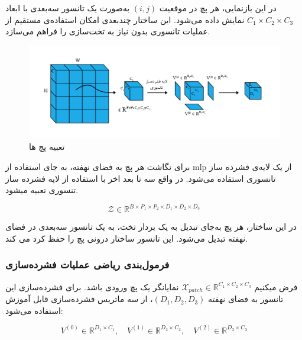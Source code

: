 در این بازنمایی، هر پچ در موقعیت $(i,j)$ به‌صورت یک تانسور سه‌بعدی با ابعاد $C_1 \times C_2 \times C_3$ نمایش داده می‌شود. این ساختار چندبعدی امکان استفاده‌ی مستقیم از عملیات تانسوری بدون نیاز به تخت‌سازی را فراهم می‌سازد.







\begin{figure}[h]
	\centering
	\begin{minipage}[b]{0.99\textwidth}
		\centering
		\includegraphics[width=\textwidth]{transformer_images/persian images/b23_2.png}
		\caption{تعبیه  پچ ها}
		\label{fig:patch embedding}
	\end{minipage}
	\hfill
\end{figure}







برای نگاشت هر پچ به فضای نهفته، به جای استفاده از mlp  از یک لایه‌ی فشرده ساز تانسوری  استفاده می‌شود. در واقع سه تا بعد اخر با استفاده از لایه فشرده ساز تنسوری تعبیه میشود.

\[
\mathcal{Z} \in \mathbb{R}^{B \times P_1 \times P_2 \times D_1 \times D_2 \times D_3}
\]

در این ساختار، هر پچ به‌جای تبدیل به یک بردار تخت، به یک تانسور سه‌بعدی در فضای نهفته تبدیل می‌شود. این تانسور ساختار درونی پچ را حفظ کرد می کند. 

\subsubsection*{فرمول‌بندی ریاضی عملیات فشرده‌سازی}

فرض میکنیم  $\mathcal{X}_{patch} \in \mathbb{R}^{C_1 \times C_2 \times C_3}$ نمایانگر یک پچ ورودی باشد. برای فشرده‌سازی این تانسور به فضای نهفته $(D_1, D_2, D_3)$، از سه ماتریس فشرده‌سازی قابل آموزش استفاده می‌شود:

\[
V^{(0)} \in \mathbb{R}^{D_1 \times C_1}, \quad
V^{(1)} \in \mathbb{R}^{D_2 \times C_2}, \quad
V^{(2)} \in \mathbb{R}^{D_3 \times C_3}
\]

